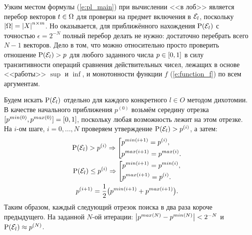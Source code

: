 Узким местом формулы (\ref{e:pl_main}) при вычислении <<в лоб>> является перебор векторов $t \in \Omega$ для проверки на предмет включения в $\mathcal{E}_l$, поскольку $\left| \Omega \right| = \left| X \right|^{n \times m}$. Но оказывается, для приближённого нахождения ${\mathrm{P}}(\mathcal{E}_l)$ с точностью $\epsilon = 2^{-N}$ полный перебор делать не нужно: достаточно перебрать всего $N-1$ векторов. Дело в том, что можно относительно просто проверить отношение ${\mathrm{P}}(\mathcal{E}_l) > p$ для любого заданного числа $p \in [0,1]$ в силу транзитивности операций сравнения действительных чисел, лежащих в основе <<работы>>  $\sup$ и $\inf$, и монотонности функции $f$ (\ref{e:function_f}) по всем аргументам. 

Будем искать ${\mathrm{P}}(\mathcal{E}_l)$ отдельно для каждого конкретного $l \in O$ методом дихотомии. В качестве начального приближения $p^{(0)}$ возьмём середину отрезка $[p^{min(0)}, p^{max(0)}] = [0,1]$, поскольку любая возможность лежит на этом отрезке. На $i$-ом шаге, $i = 0, ..., N$ проверяем утверждение ${\mathrm{P}}(\mathcal{E}_l) > p^{(i)}$, а затем:
\begin{gather*}
 \P(\Eps_l) > p^{(i)} \Rightarrow 
    \left[ 
      \begin{gathered} 
        p^{min(i+1)} = p^{(i)}, \hfill 
        \\ 
        p^{max(i+1)} = p^{max(i)}. \hfill 
        \\ 
      \end{gathered} 
    \right. \\ 
 \P(\Eps_l) \leq p^{(i)} \Rightarrow 
    \left[ 
      \begin{gathered} 
        p^{min(i+1)} = p^{min(i)}, \hfill 
        \\ 
        p^{max(i+1)} = p^{(i)}. \hfill 
        \\ 
      \end{gathered} 
    \right. \\
 p^{(i+1)} = \frac{1}{2}\big(p^{min(i+1)} + p^{max(i+1)}\big).  
\end{gather*}
Таким образом, каждый следующий отрезок поиска в два раза короче предыдущего. На заданной $N$-ой итерации: $\left| p^{max(N)} - p^{min(N)} \right| < 2^{-N}$ и ${\mathrm{P}}(\mathcal{E}_l) \approx p^{(N)}$. %

